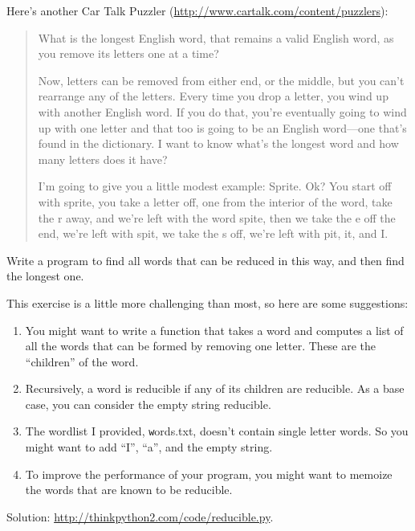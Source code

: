 \documentclass[
DIV=11,
fontsize=12,
twoside,
headinclude=false,
titlepage=firstiscover,
abstract=true,
headsepline=true,
footsepline=true,
chapterprefix=true, %
headings=big,
bibliography=totoc,%
captions=tableheading
]{scrbook}
\theoremstyle{definition}
\begin{document}
\begin{exercise}
\normalfont
{}

Here's another Car Talk Puzzler
(\url{http://www.cartalk.com/content/puzzlers}):

\begin{quote}
What is the longest English word, that remains a valid English word,
as you remove its letters one at a time?

Now, letters can be removed from either end, or the middle, but you
can't rearrange any of the letters. Every time you drop a letter, you
wind up with another English word. If you do that, you're eventually
going to wind up with one letter and that too is going to be an
English word---one that's found in the dictionary. I want to know
what's the longest word and how many letters does it
have?

I'm going to give you a little modest example: Sprite. Ok? You start
off with sprite, you take a letter off, one from the interior of the
word, take the r away, and we're left with the word spite, then we
take the e off the end, we're left with spit, we take the s off, we're
left with pit, it, and I.
\end{quote}

Write a program to find all words that can be reduced in this way,
and then find the longest one.

This exercise is a little more challenging than most, so here are
some suggestions:

\begin{enumerate}

\item You might want to write a function that takes a word and
  computes a list of all the words that can be formed by removing one
  letter.  These are the ``children'' of the word.

\item Recursively, a word is reducible if any of its children
are reducible.  As a base case, you can consider the empty
string reducible.

\item The wordlist I provided, {\texttt words.txt}, doesn't
contain single letter words.  So you might want to add
``I'', ``a'', and the empty string.

\item To improve the performance of your program, you might want
to memoize the words that are known to be reducible.

\end{enumerate}

Solution: \url{http://thinkpython2.com/code/reducible.py}.

\end{exercise}
\end{document}
